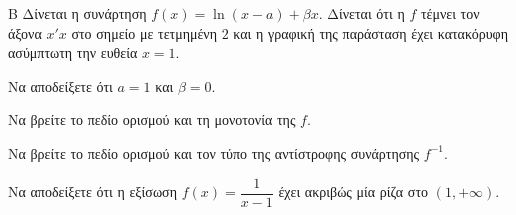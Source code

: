 \begin{thema}{Β}
Δίνεται η συνάρτηση $f(x) = \ln(x-a) + \beta x$. Δίνεται ότι η $f$ τέμνει τον άξονα $x'x$ στο σημείο με τετμημένη $2$ και η γραφική της παράσταση έχει κατακόρυφη ασύμπτωτη την ευθεία $x=1$.
\begin{erwthma}
  \item Να αποδείξετε ότι $a=1$ και $\beta=0$.
  \item Να βρείτε το πεδίο ορισμού και τη μονοτονία της $f$.
  \item Να βρείτε το πεδίο ορισμού και τον τύπο της αντίστροφης συνάρτησης $f^{-1}$.
  \item Να αποδείξετε ότι η εξίσωση $f(x) = \dfrac{1}{x-1}$ έχει ακριβώς μία ρίζα στο $(1, +\infty)$.
\end{erwthma}
\end{thema}
